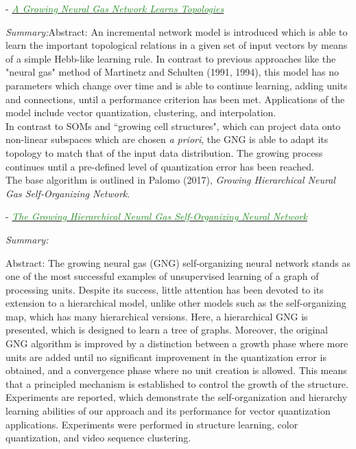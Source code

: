 \documentclass[]{article}
\newcommand{\paperentry}[4]{
            \hangindent=1cm
            \textcolor{red}{\cite{#1}} - \href{run:../References/#3}{\textcolor{ForestGreen}{\textit{#2}}}
            
            \noindent            
            \begin{minipage}[t]{0.1\linewidth}\hfill\end{minipage}
            \begin{minipage}[t]{0.8\linewidth}\textcolor{NavyBlue}{{\textit{Summary:}}}#4\end{minipage}
            \vspace{.25cm}
          }
\begin{document}
	\paperentry{Fritzke1995GrowingNeuralGas}
	{A Growing Neural Gas Network Learns Topologies}
	{Manifold_Representation_Learning/CHL/Fritzke1995GrowingNeuralGas.pdf}
	{Abstract: An incremental network model is introduced which is able to learn the important topological relations in a given set of input vectors by means of a simple Hebb-like learning rule. In contrast to previous approaches like the "neural gas" method of Martinetz and Schulten (1991, 1994), this model has no parameters which change over time and is able to continue learning, adding units and connections, until a performance criterion has been met. Applications of the model include vector quantization, clustering, and interpolation. \\
		
	\noindent
	In contrast to SOMs and ``growing cell structures", which can project data onto non-linear subspaces which are chosen \textit{a priori}, the GNG is able to adapt its topology to match that of the input data distribution.  The growing process continues until a pre-defined level of quantization error has been reached. \\
	
	\noindent
	The base algorithm is outlined in Palomo (2017), \textit{Growing Hierarchical Neural Gas Self-Organizing Network}.		
	}
	
	\paperentry{Palomo2017GHNG}
	{The Growing Hierarchical Neural Gas Self-Organizing Neural Network}
	{Manifold_Representation_Learning/CHL/Palomo2017GHNG.pdf}
	{}
	\newline
	Abstract: The growing neural gas (GNG) self-organizing neural network stands as one of the most successful examples of unsupervised learning of a graph of processing units. Despite its success, little attention has been devoted to its extension to a hierarchical model, unlike other models such as the self-organizing	map, which has many hierarchical versions. Here, a hierarchical GNG is presented, which is designed to learn a tree of graphs.  Moreover, the original GNG algorithm is improved by a distinction between a growth phase where more units are added until no significant improvement in the quantization error is obtained, and a convergence phase where no unit creation is	allowed. This means that a principled mechanism is established	to control the growth of the structure. Experiments are reported, which demonstrate the self-organization and hierarchy learning abilities of our approach and its performance for vector quantization	applications.  Experiments were performed in structure learning, color quantization, and video sequence clustering. \\
		
\end{document}
